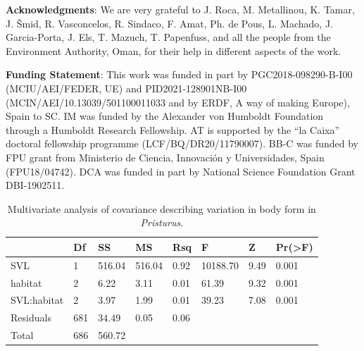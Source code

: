 \documentclass[
  11pt,
]{article}
\begin{document}
\textbf{Acknowledgments}: We are very grateful to J. Roca, M.
Metallinou, K. Tamar, J. Šmid, R. Vasconcelos, R. Sindaco, F. Amat, Ph.
de Pous, L. Machado, J. Garcia-Porta, J. Els, T. Mazuch, T. Papenfuss,
and all the people from the Environment Authority, Oman, for their help
in different aspects of the work.

\textbf{Funding Statement}: This work was funded in part by
PGC2018-098290-B-I00 (MCIU/AEI/FEDER, UE) and PID2021-128901NB-I00
(MCIN/AEI/10.13039/501100011033 and by ERDF, A way of making Europe),
Spain to SC. IM was funded by the Alexander von Humboldt Foundation
through a Humboldt Research Fellowship. AT is supported by the ``la
Caixa'' doctoral fellowship programme (LCF/BQ/DR20/11790007). BB-C was
funded by FPU grant from Ministerio de Ciencia, Innovación y
Universidades, Spain (FPU18/04742). DCA was funded in part by National
Science Foundation Grant DBI-1902511.

\newpage

\begin{table}[H]

\caption{\label{tab:unnamed-chunk-1}Multivariate analysis of covariance describing variation in body form in \textit{Pristurus}.}
\centering
\begin{tabular}[t]{llllllll}
\toprule
  & Df & SS & MS & Rsq & F & Z & Pr(>F)\\
\midrule
SVL & 1 & 516.04 & 516.04 & 0.92 & 10188.70 & 9.49 & 0.001\\
habitat & 2 & 6.22 & 3.11 & 0.01 & 61.39 & 9.32 & 0.001\\
SVL:habitat & 2 & 3.97 & 1.99 & 0.01 & 39.23 & 7.08 & 0.001\\
Residuals & 681 & 34.49 & 0.05 & 0.06 &  &  & \\
Total & 686 & 560.72 &  &  &  &  & \\
\bottomrule
\end{tabular}
\end{table}

\newpage
\end{document}
